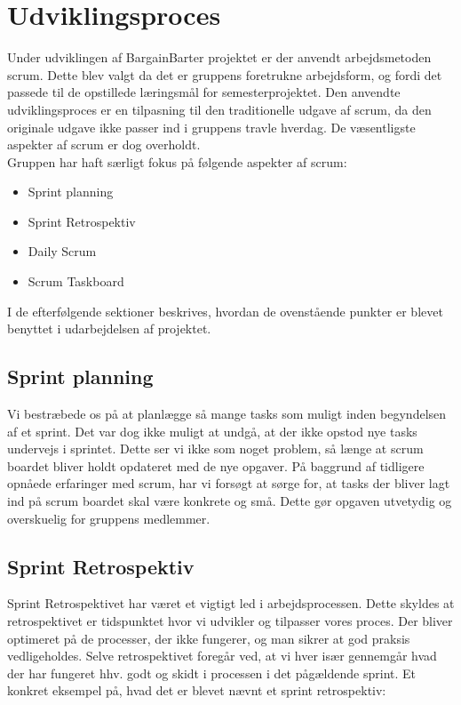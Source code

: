 \chapter{Udviklingsproces}

Under udviklingen af BargainBarter projektet er der anvendt arbejdsmetoden scrum\cite{SCRUM}. Dette blev valgt da det er gruppens foretrukne arbejdsform, og fordi det passede til de opstillede læringsmål for semesterprojektet. Den anvendte udviklingsproces er en tilpasning til den traditionelle udgave af scrum, da den originale udgave ikke passer ind i gruppens travle hverdag. De væsentligste aspekter af scrum er dog overholdt. \\ Gruppen har haft særligt fokus på følgende aspekter af scrum:

\begin{itemize}
		\item Sprint planning
		\item Sprint Retrospektiv
		\item Daily Scrum
		\item Scrum Taskboard
	\end{itemize}

\noindent I de efterfølgende sektioner beskrives, hvordan de ovenstående punkter er blevet benyttet i udarbejdelsen af projektet. 

\section{Sprint planning}
Vi bestræbede os på at planlægge så mange tasks som muligt inden begyndelsen af et sprint. Det var dog ikke muligt at undgå, at der ikke opstod nye tasks undervejs i sprintet. Dette ser vi ikke som noget problem, så længe at scrum boardet bliver holdt opdateret med de nye opgaver. På baggrund af tidligere opnåede erfaringer med scrum, har vi forsøgt at sørge for, at tasks der bliver lagt ind på scrum boardet skal være konkrete og små. Dette gør opgaven utvetydig og overskuelig for gruppens medlemmer.   


\section{Sprint Retrospektiv}
Sprint Retrospektivet har været et vigtigt led i arbejdsprocessen. Dette skyldes at retrospektivet er tidspunktet hvor vi udvikler og tilpasser vores proces. Der bliver optimeret på de processer, der ikke fungerer, og man sikrer at god praksis vedligeholdes. Selve retrospektivet foregår ved, at vi hver især gennemgår hvad der har fungeret hhv. godt og skidt i processen i det pågældende sprint. Et konkret eksempel på, hvad det er blevet nævnt et sprint retrospektiv:

